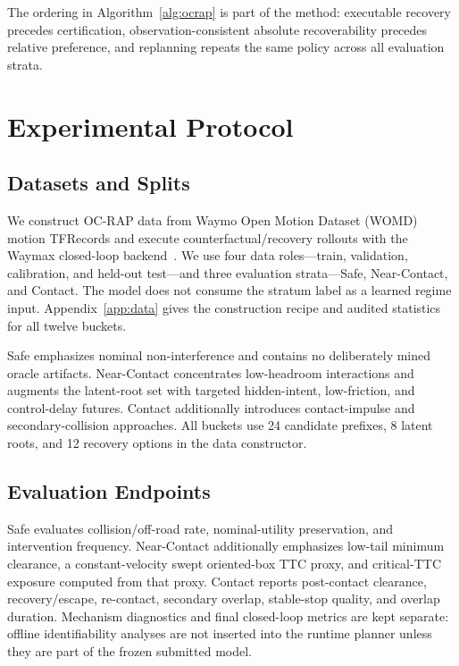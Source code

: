 \documentclass{article} %
\begin{document}
The ordering in Algorithm~\ref{alg:ocrap} is part of the method: executable recovery precedes certification, observation-consistent absolute recoverability precedes relative preference, and replanning repeats the same policy across all evaluation strata.

\section{Experimental Protocol}
\label{sec:experiments}

\subsection{Datasets and Splits}
We construct OC-RAP data from Waymo Open Motion Dataset (WOMD) motion TFRecords and execute counterfactual/recovery rollouts with the Waymax closed-loop backend~\citep{ettinger2021large,gulino2023waymax}. We use four data roles---train, validation, calibration, and held-out test---and three evaluation strata---Safe, Near-Contact, and Contact. The model does not consume the stratum label as a learned regime input. Appendix~\ref{app:data} gives the construction recipe and audited statistics for all twelve buckets.

Safe emphasizes nominal non-interference and contains no deliberately mined oracle artifacts. Near-Contact concentrates low-headroom interactions and augments the latent-root set with targeted hidden-intent, low-friction, and control-delay futures. Contact additionally introduces contact-impulse and secondary-collision approaches. All buckets use 24 candidate prefixes, 8 latent roots, and 12 recovery options in the data constructor.

\subsection{Evaluation Endpoints}
Safe evaluates collision/off-road rate, nominal-utility preservation, and intervention frequency. Near-Contact additionally emphasizes low-tail minimum clearance, a constant-velocity swept oriented-box TTC proxy, and critical-TTC exposure computed from that proxy. Contact reports post-contact clearance, recovery/escape, re-contact, secondary overlap, stable-stop quality, and overlap duration. Mechanism diagnostics and final closed-loop metrics are kept separate: offline identifiability analyses are not inserted into the runtime planner unless they are part of the frozen submitted model.
\end{document}
